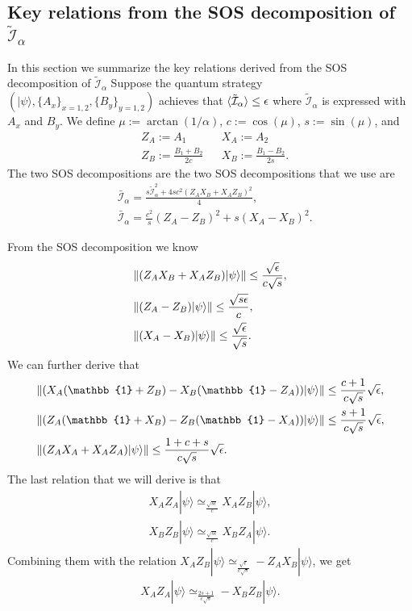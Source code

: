 \documentclass[11pt,letterpaper]{article}
\newcommand{\ket}[1]{|#1\rangle}
\DeclarePairedDelimiter{\norm}{\lVert}{\rVert}
\DeclarePairedDelimiter{\ip}{\langle}{\rangle}
\newcommand{\1}{\mathbb{1}}
\newcommand{\I}{\mathcal{I}}
\newcommand{\appd}[1]{\simeq_{#1}}
\theoremstyle{definition}
\begin{document}
\subsection{Key relations from the SOS decomposition of $\tilde{\I}_\alpha$}
In this section we summarize the key relations derived from the SOS decomposition of $\tilde{\I}_\alpha$
Suppose the quantum strategy $(\ket{\psi}, \{A_x\}_{x=1,2}, \{B_{y }\}_{y=1,2})$ achieves that 
$\ip{\tilde{\I}_\alpha} \leq \epsilon$ where
$\tilde{\I}_\alpha$ is expressed with $A_x$ and $B_y$.
We define $\mu := \arctan(1/\alpha)$, $c := \cos(\mu)$, $s := \sin(\mu)$, and
\begin{align}
	&Z_A := A_1 && X_A := A_2\\
	&Z_B := \frac{B_1+B_2}{2c} && X_B := \frac{B_1-B_2}{2s}.
\end{align}
The two SOS decompositions are 
the two SOS decompositions that we use are
\begin{align}
	\label{eq:sos1}&\bar{\I}_\alpha = \frac{s \tilde{\I}_\alpha^2 + 4sc^2(Z_AX_B+X_AZ_B)^2}{4},\\
	\label{eq:sos2}&\bar{\I}_\alpha = \frac{c^2}{s}(Z_A-Z_B)^2 + s (X_A-X_B)^2.
\end{align}

From the SOS decomposition we know 
\begin{align}
	&\norm{(Z_AX_B+X_AZ_B)\ket{\psi}} \leq \frac{\sqrt{\epsilon}}{c\sqrt{s}},\\
	&\norm{(Z_A-Z_B)\ket{\psi}} \leq \frac{\sqrt{s\epsilon}}{c},\\
	&\norm{(X_A-X_B)\ket{\psi}} \leq \frac{\sqrt{\epsilon}}{\sqrt{s}}.
\end{align}
We can further derive that 
\begin{align}
	\label{eq:xazb}&\norm{(X_A(\1+Z_B)-X_B(\1-Z_A))\ket{\psi}} \leq \frac{c+1}{c\sqrt{s}} \sqrt{\epsilon},\\
	\label{eq:zaxb}&\norm{(Z_A(\1+X_B)-Z_B(\1-X_A))\ket{\psi}}\leq \frac{s+1}{c\sqrt{s}} \sqrt{\epsilon},\\
	&\norm{(Z_AX_A+X_AZ_A)\ket{\psi}} \leq \frac{1+c+s}{c\sqrt{s}} \sqrt{\epsilon}.
\end{align}
The last relation that we will derive is that 
\begin{align}
	X_AZ_A \ket{\psi} \appd{\frac{\sqrt{s\epsilon}}{c}} X_AZ_B \ket{\psi},\\
	X_BZ_B \ket{\psi} \appd{\frac{\sqrt{s\epsilon}}{c}} X_BZ_A\ket{\psi}.
\end{align}
Combining them with the relation $X_AZ_B \ket{\psi} \appd{\frac{\sqrt{\epsilon}}{c\sqrt{s}}} -Z_AX_B\ket{\psi}$,
we get 
\begin{align}
	X_AZ_A \ket{\psi} \appd{\frac{2s+1}{c\sqrt{s}}} -X_BZ_B \ket{\psi}.
\end{align}
\end{document}
